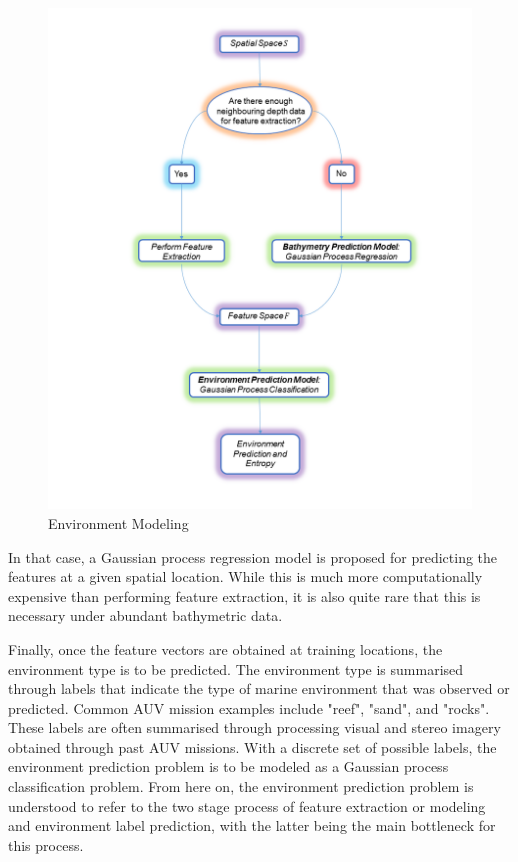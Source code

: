 		\begin{figure}[!htbp]
			\centering
				\includegraphics[width=\textwidth]{Figures/modelingprocess.png}
			\caption{Environment Modeling}
			\label{Background:OceanEnvironmentModeling:Figure:modelingprocess}
		\end{figure}
				
		In that case, a Gaussian process regression model is proposed for predicting the features at a given spatial location. While this is much more computationally expensive than performing feature extraction, it is also quite rare that this is necessary under abundant bathymetric data.
		
		Finally, once the feature vectors are obtained at training locations, the environment type is to be predicted. The environment type is summarised through labels that indicate the type of marine environment that was observed or predicted. Common AUV mission examples include "reef", "sand", and "rocks". These labels are often summarised through processing visual and stereo imagery obtained through past AUV missions. With a discrete set of possible labels, the environment prediction problem is to be modeled as a Gaussian process classification problem. From here on, the environment prediction problem is understood to refer to the two stage process of feature extraction or modeling and environment label prediction, with the latter being the main bottleneck for this process.
		
